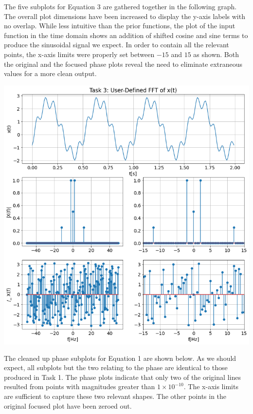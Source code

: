 \documentclass[12pt]{report}
\begin{document}
The five subplots for Equation 3 are gathered together in the following graph. The overall plot dimensions have been increased to display the y-axis labels with no overlap. While less intuitive than the prior functions, the plot of the input function in the time domain shows an addition of shifted cosine and sine terms to produce the sinusoidal signal we expect. In order to contain all the relevant points, the x-axis limits were properly set between $ -15 $ and $ 15 $ as shown. Both the original and the focused phase plots reveal the need to eliminate extraneous values for a more clean output.

\begin{center}
	\includegraphics[scale = 0.4]{Lab 9 - Plots/Task3.png}\\[1.0 cm]
\end{center}

The cleaned up phase subplots for Equation 1 are shown below. As we should expect, all subplots but the two relating to the phase are identical to those produced in Task 1. The phase plots indicate that only two of the original lines resulted from points with magnitudes greater than $ 1\times 10^{-10} $. The x-axis limits are sufficient to capture these two relevant shapes. The other points in the original focused plot have been zeroed out. \\
\end{document}
